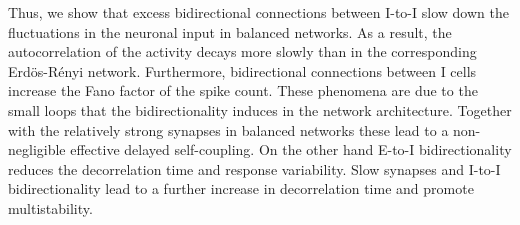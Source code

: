 Thus, we show that excess bidirectional connections between I-to-I slow down the fluctuations in the neuronal input in balanced networks. As a result, the autocorrelation of the activity decays more slowly than in the corresponding Erdös-Rényi network. Furthermore, bidirectional connections between I cells increase the Fano factor of the spike count. These phenomena are due to the small loops that the bidirectionality induces in the network architecture. Together with the relatively strong synapses in balanced networks these lead to a non-negligible effective delayed self-coupling. On the other hand E-to-I bidirectionality reduces the decorrelation time and response variability. Slow synapses and I-to-I bidirectionality lead to a further increase in decorrelation time and promote multistability.



